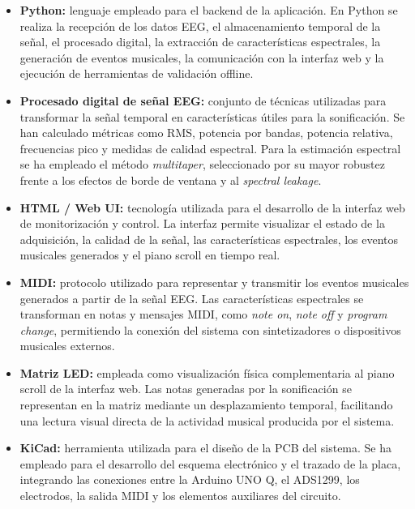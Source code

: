 \documentclass[../main.tex]{subfiles}
\begin{document}
\begin{itemize}
    \item \textbf{Python:} lenguaje empleado para el backend de la aplicación. En Python se realiza la recepción de los datos EEG, el almacenamiento temporal de la señal, el procesado digital, la extracción de características espectrales, la generación de eventos musicales, la comunicación con la interfaz web y la ejecución de herramientas de validación offline.

    \item \textbf{Procesado digital de señal EEG:} conjunto de técnicas utilizadas para transformar la señal temporal en características útiles para la sonificación. Se han calculado métricas como RMS, potencia por bandas, potencia relativa, frecuencias pico y medidas de calidad espectral. Para la estimación espectral se ha empleado el método \textit{multitaper}, seleccionado por su mayor robustez frente a los efectos de borde de ventana y al \textit{spectral leakage}.

    \item \textbf{HTML / Web UI:} tecnología utilizada para el desarrollo de la interfaz web de monitorización y control. La interfaz permite visualizar el estado de la adquisición, la calidad de la señal, las características espectrales, los eventos musicales generados y el piano scroll en tiempo real.

    \item \textbf{MIDI:} protocolo utilizado para representar y transmitir los eventos musicales generados a partir de la señal EEG. Las características espectrales se transforman en notas y mensajes MIDI, como \textit{note on}, \textit{note off} y \textit{program change}, permitiendo la conexión del sistema con sintetizadores o dispositivos musicales externos.

    \item \textbf{Matriz LED:} empleada como visualización física complementaria al piano scroll de la interfaz web. Las notas generadas por la sonificación se representan en la matriz mediante un desplazamiento temporal, facilitando una lectura visual directa de la actividad musical producida por el sistema.

    \item \textbf{KiCad:} herramienta utilizada para el diseño de la PCB del sistema. Se ha empleado para el desarrollo del esquema electrónico y el trazado de la placa, integrando las conexiones entre la Arduino UNO Q, el ADS1299, los electrodos, la salida MIDI y los elementos auxiliares del circuito.


\end{itemize}
\end{document}
